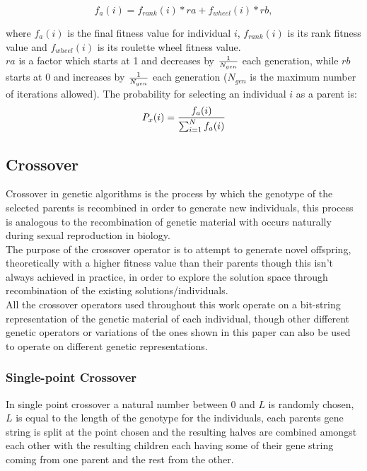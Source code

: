 	\begin{equation*}
	f_a(i) = f_{rank}(i)*ra + f_{wheel}(i)*rb,
	\end{equation*}

	where $f_a(i)$ is the final fitness value for individual $i$, $f_{rank}(i)$ is its rank fitness value and $f_{wheel}(i)$ is its roulette wheel fitness value.
	\\$ra$ is a factor which starts at 1 and decreases by $1\over{N_{gen}}$ each generation, while $rb$ starts at 0 and increases by $1\over{N_{gen}}$ each generation ($N_{gen}$ is the maximum number of iterations allowed).
	The probability for selecting an individual $i$ as a parent is:
	\begin{equation*}
	P_x(i) = {f_a(i)\over{\sum_{i=1}^{N}f_a(i)}}
	\end{equation*}

\subsection{Crossover}
Crossover in genetic algorithms is the process by which the genotype of the selected parents is recombined in order to generate new individuals, this process is analogous to the recombination of genetic material with occurs naturally during sexual reproduction in biology.
\\The purpose of the crossover operator is to attempt to generate novel offspring, theoretically with a higher fitness value than their parents though this isn't always achieved in practice, in order to explore the solution space through recombination of the existing solutions/individuals. 
\\All the crossover operators used throughout this work operate on a bit-string representation of the genetic material of each individual, though other different genetic operators or variations of the ones shown in this paper can also be used to operate on different genetic representations. 


	\subsubsection{Single-point Crossover}

	In single point crossover a natural number between 0 and $L$ is randomly chosen, $L$ is equal to the length of the genotype for the individuals, each parents gene string is split at the point chosen and the resulting halves are combined amongst each other with the resulting children each having some of their gene string coming from one parent and the rest from the other.

